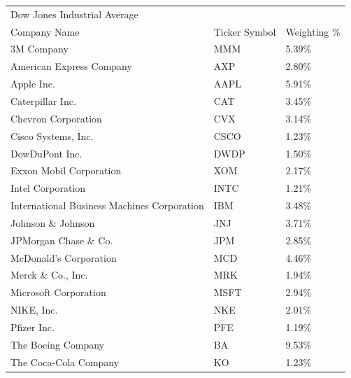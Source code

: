 \documentclass{article}
\begin{document}
\begin{center}
\begin{table}[h]
\begin{tabular}{lll}
Dow Jones Industrial Average                &               &              \\
Company Name                                & Ticker Symbol & Weighting \% \\
3M Company                                  & MMM           & 5.39\%       \\
American Express Company                    & AXP           & 2.80\%       \\
Apple Inc.                                  & AAPL          & 5.91\%       \\
Caterpillar Inc.                            & CAT           & 3.45\%       \\
Chevron Corporation                         & CVX           & 3.14\%       \\
Cisco Systems, Inc.                         & CSCO          & 1.23\%       \\
DowDuPont Inc.                              & DWDP          & 1.50\%       \\
Exxon Mobil Corporation                     & XOM           & 2.17\%       \\
Intel Corporation                           & INTC          & 1.21\%       \\
International Business Machines Corporation & IBM           & 3.48\%       \\
Johnson \& Johnson                          & JNJ           & 3.71\%       \\
JPMorgan Chase \& Co.                       & JPM           & 2.85\%       \\
McDonald's Corporation                      & MCD           & 4.46\%       \\
Merck \& Co., Inc.                          & MRK           & 1.94\%       \\
Microsoft Corporation                       & MSFT          & 2.94\%       \\
NIKE, Inc.                                  & NKE           & 2.01\%       \\
Pfizer Inc.                                 & PFE           & 1.19\%       \\
The Boeing Company                          & BA            & 9.53\%       \\
The Coca-Cola Company                       & KO            & 1.23\%       \\

\end{tabular}
\end{table}
\end{center}
\end{document}
